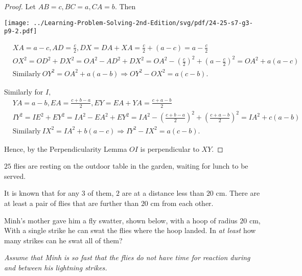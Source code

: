 \documentclass{article}
\begin{document}
\newpage

\begin{proof}
    Let $AB=c, BC=a, CA=b.$ Then 

    \begin{center}
        \texttt{[image: ../Learning-Problem-Solving-2nd-Edition/svg/pdf/24-25-s7-g3-p9-2.pdf]}
    \end{center}
    
    \[ 
        \begin{aligned}
            &XA = a-c, AD=\frac{c}{2}, DX = DA + XA = \frac{c}{2} + (a-c) = a - \frac{c}{2}\\
            &OX^2 = OD^2 + DX^2 = OA^2 - AD^2 + DX^2 = OA^2 - \left(\frac{c}{2}\right)^2 + \left(a - \frac{c}{2}\right)^2 = OA^2 + a(a-c)\\
            &\text{Similarly}\ OY^2 = OA^2 + a(a-b) \Rightarrow OY^2 - OX^2 = a(c-b).
        \end{aligned}
    \]

    Similarly for $I,$
    \[ 
        \begin{aligned}
            &YA=a-b, EA = \frac{c+b-a}{2}, EY = EA + YA = \frac{c+a-b}{2}\\
            &IY^2 = IE^2 + EY^2 = IA^2 - EA^2 + EY^2 = IA^2 - \left(\frac{c+b-a}{2}\right)^2 + \left(\frac{c+a-b}{2}\right)^2 = IA^2 + c(a-b)\\
            &\text{Similarly}\ IX^2 = IA^2 + b(a-c) \Rightarrow IY^2 - IX^2 = a(c-b).
        \end{aligned}
    \]

    Hence, by the Perpendicularity Lemma $OI$ is perpendicular to $XY.$
\end{proof}

\newpage

\begin{problem}
    $25$ flies are resting on the outdoor table in the garden, waiting for lunch to be served.
    \begin{itemize}[topsep=0pt, partopsep=0pt, itemsep=0pt]
        \ii It is known that for any $3$ of them, $2$ are at a distance less than $20$ cm.
        \ii There are at least a pair of flies that are further than $20$ cm from each other.
    \end{itemize}
    
    Minh's mother gave him a fly swatter, shown below, with a hoop of radius $20$ cm,
    With a single strike he can swat the flies where the hoop landed.
    In \textit{at least} how many strikes can he swat all of them?

    \textit{Assume that Minh is so fast that the flies do not have time for reaction during and between his lightning strikes.}
\end{problem}
\end{document}
